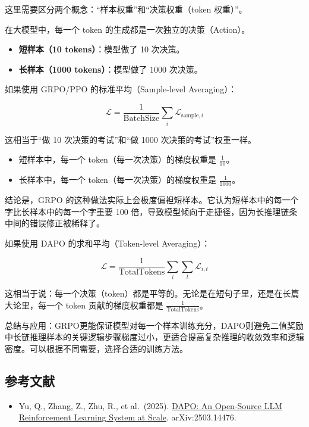 这里需要区分两个概念：``样本权重''和``决策权重（token 权重）''。

在大模型中，每一个 token 的生成都是一次独立的决策（Action）。

\begin{itemize}
\tightlist
\item
  \textbf{短样本（10 tokens）}：模型做了 10 次决策。
\item
  \textbf{长样本（1000 tokens）}：模型做了 1000 次决策。
\end{itemize}

如果使用 GRPO/PPO 的标准平均（Sample-level Averaging）：

\[
\mathcal{L}
=
\frac{1}{\mathrm{BatchSize}}
\sum_i \mathcal{L}_{\mathrm{sample},i}
\]

这相当于``做 10 次决策的考试''和``做 1000 次决策的考试''权重一样。

\begin{itemize}
\tightlist
\item
  短样本中，每一个 token（每一次决策）的梯度权重是 \(\frac{1}{10}\)。
\item
  长样本中，每一个 token（每一次决策）的梯度权重是 \(\frac{1}{1000}\)。
\end{itemize}

结论是，GRPO 的这种做法实际上会极度偏袒短样本。它认为短样本中的每一个字比长样本中的每一个字重要 100 倍，导致模型倾向于走捷径，因为长推理链条中间的错误修正被稀释了。

如果使用 DAPO 的求和平均（Token-level Averaging）：

\[
\mathcal{L}
=
\frac{1}{\mathrm{TotalTokens}}
\sum_i \sum_t \mathcal{L}_{i,t}
\]

这相当于说：每一个决策（token）都是平等的。无论是在短句子里，还是在长篇大论里，每一个 token 贡献的梯度权重都是 \(\frac{1}{\mathrm{TotalTokens}}\)。

总结与应用：GRPO更能保证模型对每一个样本训练充分，DAPO则避免二值奖励中长链推理样本的关键逻辑步骤梯度过小，更适合提高复杂推理的收敛效率和逻辑密度。可以根据不同需要，选择合适的训练方法。

\hypertarget{ux53c2ux8003ux6587ux732e-107}{%
\subsection{参考文献}\label{ux53c2ux8003ux6587ux732e-107}}

\begin{itemize}
\tightlist
\item
  Yu, Q., Zhang, Z., Zhu, R., et al.~(2025). \href{https://arxiv.org/abs/2503.14476}{DAPO: An Open-Source LLM Reinforcement Learning System at Scale}. arXiv:2503.14476.
\end{itemize}

